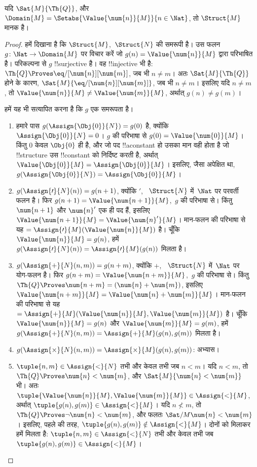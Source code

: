 \documentclass[../../../include/open-logic-section]{subfiles}
\begin{document}
\begin{prop}
यदि $\Sat{M}{\Th{Q}}$, और $\Domain{M} = \Setabs{\Value{\num{n}}{M}}{n
  \in \Nat}$, तो $\Struct{M}$ मानक है।
\end{prop}

\begin{proof}
हमें दिखाना है कि $\Struct{M}$,~$\Struct{N}$ की समरूपी है। उस फलन
$g\colon \Nat \to \Domain{M}$ पर विचार करें जो
$g(n) = \Value{\num{n}}{M}$ द्वारा परिभाषित है। परिकल्पना से $g$
!!{surjective} है। वह !!{injective} भी है:
$\Th{Q} \Proves
\eq/[\num{n}][\num{m}]$, जब भी $n \neq m$। अतः $\Sat{M}{\Th{Q}}$ होने
के कारण, $\Sat{M}{\eq/[\num{n}][\num{m}]}$, जब भी $n \neq
m$। इसलिए यदि $n \neq m$, तो
$\Value{\num{n}}{M} \neq
\Value{\num{m}}{M}$,
अर्थात् $g(n) \neq g(m)$।

हमें यह भी सत्यापित करना है कि $g$ एक समरूपता है।
\begin{enumerate}
\item हमारे पास $g(\Assign{\Obj{0}}{N}) = g(0)$ है, क्योंकि
  $\Assign{\Obj{0}}{N} = 0$। $g$ की परिभाषा से $g(0) =
  \Value{\num{0}}{M}$। किंतु $\num{0}$ केवल $\Obj{0}$ ही है, और जो पद
  !!a{constant} हो उसका मान वही होता है जो !!{structure} उस
  !!{constant} को निर्दिष्ट करती है, अर्थात्
  $\Value{\Obj{0}}{M} = \Assign{\Obj{0}}{M}$। इसलिए, जैसा अपेक्षित था,
  $g(\Assign{\Obj{0}}{N}) = \Assign{\Obj{0}}{M}$।
\item $g(\Assign{\prime}{N}(n)) = g(n+1)$, क्योंकि $\prime$,
  ~$\Struct{N}$ में~$\Nat$ पर परवर्ती फलन है। फिर
  $g(n+1) =
  \Value{\num{n+1}}{M}$,~$g$ की परिभाषा से। किंतु $\num{n+1}$ और
  $\num{n}'$ एक ही पद हैं, इसलिए
  $\Value{\num{n+1}}{M} =
  \Value{\num{n}'}{M}$। मान-फलन की
  परिभाषा से यह $= \Assign{\prime}{M}(\Value{\num{n}}{M})$ है। चूँकि
  $\Value{\num{n}}{M} = g(n)$, हमें $g(\Assign{\prime}{N}(n)) =
  \Assign{\prime}{M}(g(n))$ मिलता है।
\item $g(\Assign{+}{N}(n,m)) = g(n+m)$, क्योंकि $+$,
  ~$\Struct{N}$ में~$\Nat$ पर योग-फलन है। फिर
  $g(n+m) =
  \Value{\num{n+m}}{M}$,~$g$ की परिभाषा से। किंतु $\Th{Q} \Proves
  \num{n+m} = (\num{n} + \num{m})$, इसलिए $\Value{\num{n+m}}{M} =
  \Value{\num{n}+\num{m}}{M}$। मान-फलन की परिभाषा से यह $=
  \Assign{+}{M}(\Value{\num{n}}{M},\Value{\num{m}}{M})$ है। चूँकि
  $\Value{\num{n}}{M} = g(n)$ और $\Value{\num{m}}{M} = g(m)$, हमें
  $g(\Assign{+}{N}(n, m)) = \Assign{+}{M}(g(n), g(m))$ मिलता है।
\item $g(\Assign{\times}{N}(n, m)) = \Assign{\times}{M}(g(n), g(m))$:
  अभ्यास।
\item $\tuple{n,m} \in \Assign{<}{N}$ तभी और केवल तभी जब $n < m$। यदि
  $n < m$, तो $\Th{Q} \Proves \num{n} < \num{m}$, और
  $\Sat{M}{\num{n} <
  \num{m}}$ भी। अतः
  $\tuple{\Value{\num{n}}{M}, \Value{\num{m}}{M}} \in
  \Assign{<}{M}$, अर्थात् $\tuple{g(n), g(m)} \in \Assign{<}{M}$। यदि
  $n
  \not< m$, तो $\Th{Q} \Proves \lnot \num{n} < \num{m}$, और फलतः
  $\Sat/{M}{\num{n} < \num{m}}$। इसलिए, पहले की तरह,
  $\tuple{g(n), g(m)} \notin \Assign{<}{M}$। दोनों को मिलाकर हमें मिलता है:
  $\tuple{n,m} \in \Assign{<}{N}$ तभी और केवल तभी जब
  $\tuple{g(n), g(m)} \in
  \Assign{<}{M}$।
\end{enumerate}
\end{proof}
\end{document}
